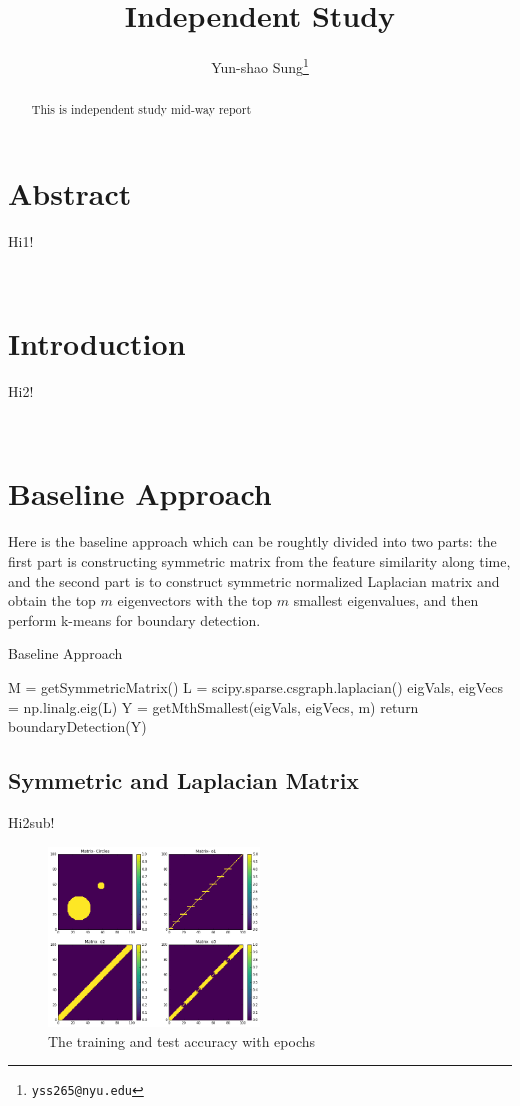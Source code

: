 \documentclass[final]{siamltexmm}
\title{Independent Study}
\author{Yun-shao Sung\thanks{\tt yss265@nyu.edu} }
\begin{document}
\maketitle

\begin{abstract}
This is independent study mid-way report
\end{abstract}

\pagestyle{myheadings}
\thispagestyle{plain}

\section{Abstract}
Hi1!

\\
\section{Introduction}
Hi2!

\\
\section{Baseline Approach}
Here is the baseline approach which can be roughtly divided into two parts: the first part is constructing symmetric matrix from the feature similarity along time, and the second part is to construct symmetric normalized Laplacian matrix and obtain the top $m$ eigenvectors with the top $m$ smallest eigenvalues, and then perform k-means for boundary detection.

\begin{algorithm}[htb]
  \caption{Baseline Approach}
  \label{algo:SC}
\begin{algorithmic}[1]
  \STATE M = getSymmetricMatrix()
  \STATE L = scipy.sparse.csgraph.laplacian()
  \STATE eigVals, eigVecs = np.linalg.eig(L)
  \STATE Y = getMthSmallest(eigVals, eigVecs, m)
  \STATE return boundaryDetection(Y)
\end{algorithmic}
\end{algorithm}


\subsection{Symmetric and Laplacian Matrix}
Hi2sub!
\begin{figure}[H]
  \centering
    \includegraphics[width=0.5\textwidth]{./figure/similarityMatrix.png}
  \caption{The training and test accuracy with epochs}
\end{figure}
\end{document}
